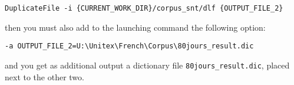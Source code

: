 \begin{Verbatim}[fontsize=\small,fontfamily=helvetica]
DuplicateFile -i {CURRENT_WORK_DIR}/corpus_snt/dlf {OUTPUT_FILE_2}
\end{Verbatim}

\noindent then you must also add to the launching command the following option:

\begin{Verbatim}[fontsize=\small,fontfamily=helvetica]
-a OUTPUT_FILE_2=U:\Unitex\French\Corpus\80jours_result.dic
\end{Verbatim}

\noindent and you get as additional output a dictionary file \verb$80jours_result.dic$, 
placed next to the other two.
